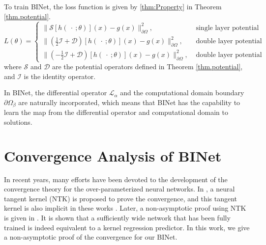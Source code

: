 \documentclass[hyperref]{article}
\numberwithin{equation}{section}
\theoremstyle{nonumberplain}
\begin{document}
	To train BINet, the loss function is given by \eqref{thm:Property} in Theorem \ref{thm.potential}.
	\begin{equation}\label{eq.loss}
		L(\theta) = \begin{cases}
			\|\mathcal{S}[h(\ \cdot \ ;\theta)](x)-g(x)\|^2_{\partial\Omega}, & \text{ single layer potential}\\[0.5em]
			\|(\frac{1}{2}\mathcal{I}+\mathcal{D})[h(\ \cdot \ ;\theta)](x)-g(x)\|^2_{\partial\Omega}, &\text{ double layer potential (Interior problem)}\\[0.5em]
			\|(-\frac{1}{2}\mathcal{I}+\mathcal{D})[h(\ \cdot \ ;\theta)](x)-g(x)\|^2_{\partial\Omega}, &\text{ double layer potential (Exterior problem)}
		\end{cases}
	\end{equation}
	where $\mathcal{S}$ and $\mathcal{D}$ are the potential operators defined in Theorem \ref{thm.potential}, and $\mathcal{I}$ is the identity operator.
	
	
	In BINet, the differential operator $\mathcal{L}_\alpha$ and the computational domain boundary $\partial \Omega_\beta$ are naturally incorporated, which means that BINet has the capability to learn the map from the differential operator and computational domain to solutions. 
	
	
	
	
	
	
	
	
	
	
	
	
	
	
	
	
	
	
	\section{Convergence Analysis of BINet}
	\label{sec:ntk}
	
	In recent years, many efforts have been devoted to the development of the convergence theory for the over-parameterized neural networks. In \cite{jacot2018neural}, a neural tangent kernel (NTK) is proposed to prove the convergence, and this tangent kernel is also implicit in these works \cite{du2019gradient, du2018gradient, li2018learning}. Later, a non-asymptotic proof using NTK is given in \cite{arora2019exact}. It is shown that a sufficiently wide network that has been fully trained is indeed equivalent to a kernel regression predictor. In this work, we give a non-asymptotic proof of the convergence for our BINet.
	
\end{document}
